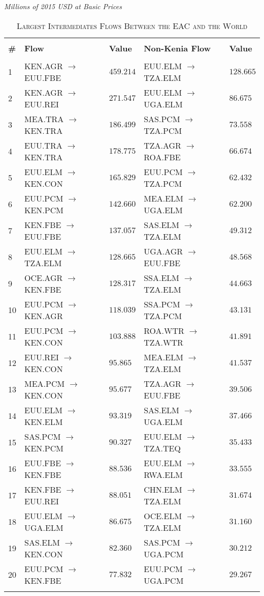 \documentclass[a4paper]{article}
\begin{document}
\begin{table}[!htbp] \centering 
  \caption{\textsc{Largest Intermediates Flows Between the EAC and the World}} 
  \small{\textit{Millions of 2015 USD at Basic Prices}}
  \label{tab:weaclfl} 
\begin{tabular}{@{\extracolsep{5pt}} lllll} 
\\[-1.8ex]\hline 
\hline \\[-1.8ex] 
\textbf{\#} & \textbf{Flow} & \textbf{Value} & \textbf{Non-Kenia Flow} & \textbf{Value} \\ 
\hline \\[-1.8ex] 
1 & KEN.AGR $\to$  EUU.FBE & $459.214$ & EUU.ELM $\to$  TZA.ELM & $128.665$ \\ 
2 & KEN.AGR $\to$  EUU.REI & $271.547$ & EUU.ELM $\to$  UGA.ELM & $86.675$ \\ 
3 & MEA.TRA $\to$  KEN.TRA & $186.499$ & SAS.PCM $\to$  TZA.PCM & $73.558$ \\ 
4 & EUU.TRA $\to$  KEN.TRA & $178.775$ & TZA.AGR $\to$  ROA.FBE & $66.674$ \\ 
5 & EUU.ELM $\to$  KEN.CON & $165.829$ & EUU.PCM $\to$  TZA.PCM & $62.432$ \\ 
6 & EUU.PCM $\to$  KEN.PCM & $142.660$ & MEA.ELM $\to$  UGA.ELM & $62.200$ \\ 
7 & KEN.FBE $\to$  EUU.FBE & $137.057$ & SAS.ELM $\to$  TZA.ELM & $49.312$ \\ 
8 & EUU.ELM $\to$  TZA.ELM & $128.665$ & UGA.AGR $\to$  EUU.FBE & $48.568$ \\ 
9 & OCE.AGR $\to$  KEN.FBE & $128.317$ & SSA.ELM $\to$  TZA.ELM & $44.663$ \\ 
10 & EUU.PCM $\to$  KEN.AGR & $118.039$ & SSA.PCM $\to$  TZA.PCM & $43.131$ \\ 
11 & EUU.PCM $\to$  KEN.CON & $103.888$ & ROA.WTR $\to$  TZA.WTR & $41.891$ \\ 
12 & EUU.REI $\to$  KEN.CON & $95.865$ & MEA.ELM $\to$  TZA.ELM & $41.537$ \\ 
13 & MEA.PCM $\to$  KEN.CON & $95.677$ & TZA.AGR $\to$  EUU.FBE & $39.506$ \\ 
14 & EUU.ELM $\to$  KEN.ELM & $93.319$ & SAS.ELM $\to$  UGA.ELM & $37.466$ \\ 
15 & SAS.PCM $\to$  KEN.PCM & $90.327$ & EUU.ELM $\to$  TZA.TEQ & $35.433$ \\ 
16 & EUU.FBE $\to$  KEN.FBE & $88.536$ & EUU.ELM $\to$  RWA.ELM & $33.555$ \\ 
17 & KEN.FBE $\to$  EUU.REI & $88.051$ & CHN.ELM $\to$  TZA.ELM & $31.674$ \\ 
18 & EUU.ELM $\to$  UGA.ELM & $86.675$ & OCE.ELM $\to$  TZA.ELM & $31.160$ \\ 
19 & SAS.ELM $\to$  KEN.CON & $82.360$ & SAS.PCM $\to$  UGA.PCM & $30.212$ \\ 
20 & EUU.PCM $\to$  KEN.FBE & $77.832$ & EUU.PCM $\to$  UGA.PCM & $29.267$ \\ 
\hline \\[-1.8ex] 
\end{tabular} 
\end{table} 
\end{document}
